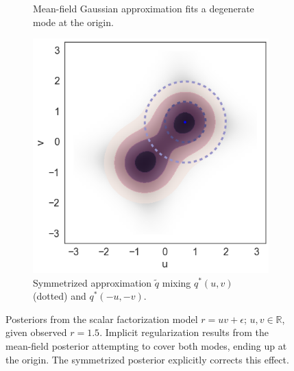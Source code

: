 \documentclass{article}
\begin{document}
\begin{figure}[t]
\begin{subfigure}[t]{.3\textwidth}
\caption{Mean-field Gaussian approximation fits a degenerate mode at the
  origin.}
\end{subfigure}
\begin{subfigure}[t]{.3\textwidth}
\includegraphics[width=\textwidth]{signflip_symmetric_posterior}
\caption{Symmetrized approximation $\tilde{q}$ mixing $q^*(u,v)$ (dotted) and $q^*(-u,-v)$.}
\end{subfigure}
\caption{Posteriors from the scalar factorization model $r = uv +
  \epsilon$; $u,v \in \mathbb{R}$, given observed
  $r=1.5$. Implicit regularization results from the mean-field
  posterior attempting to cover both modes, ending up at the
  origin. The symmetrized posterior explicitly corrects this effect.}
\label{fig:signflip_demo}
\end{figure}
\end{document}
